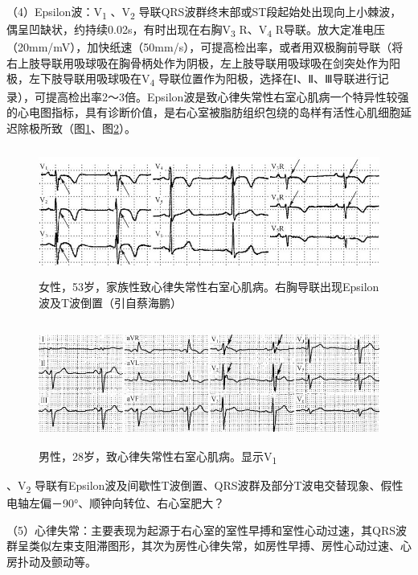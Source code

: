 （4）Epsilon波：V\textsubscript{1} 、V\textsubscript{2}
导联QRS波群终末部或ST段起始处出现向上小棘波，偶呈凹缺状，约持续0.02s，有时出现在右胸V\textsubscript{3}
R、V\textsubscript{4}
R导联。放大定准电压（20mm/mV），加快纸速（50mm/s），可提高检出率，或者用双极胸前导联（将右上肢导联用吸球吸在胸骨柄处作为阴极，左上肢导联用吸球吸在剑突处作为阳极，左下肢导联用吸球吸在V\textsubscript{4}
导联位置作为阳极，选择在Ⅰ、Ⅱ、Ⅲ导联进行记录），可提高检出率2～3倍。Epsilon波是致心律失常性右室心肌病一个特异性较强的心电图指标，具有诊断价值，是右心室被脂肪组织包绕的岛样有活性心肌细胞延迟除极所致（图\ref{fig43-4}、图\ref{fig43-5}）。

\begin{figure}[!htbp]
 \centering
 \includegraphics[width=5.20833in,height=1.65625in]{./images/Image00707.jpg}
 \captionsetup{justification=centering}
 \caption{女性，53岁，家族性致心律失常性右室心肌病。右胸导联出现Epsilon波及T波倒置（引自蔡海鹏）}
 \label{fig43-4}
  \end{figure} 

\begin{figure}[!htbp]
 \centering
 \includegraphics[width=5.58333in,height=1.59375in]{./images/Image00708.jpg}
 \captionsetup{justification=centering}
 \caption{男性，28岁，致心律失常性右室心肌病。显示V\textsubscript{1}}
 \label{fig43-5}
  \end{figure} 
、V\textsubscript{2}
导联有Epsilon波及间歇性T波倒置、QRS波群及部分T波电交替现象、假性电轴左偏－90°、顺钟向转位、右心室肥大？

（5）心律失常：主要表现为起源于右心室的室性早搏和室性心动过速，其QRS波群呈类似左束支阻滞图形，其次为房性心律失常，如房性早搏、房性心动过速、心房扑动及颤动等。

